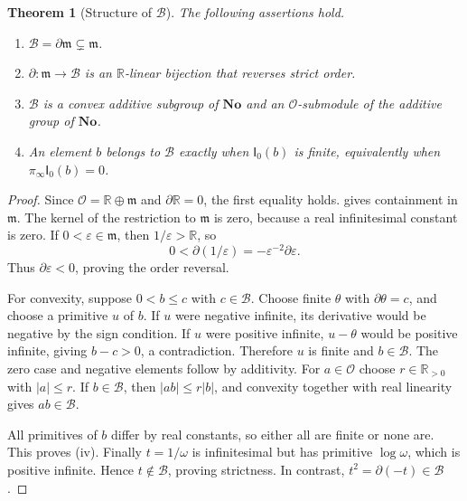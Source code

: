\documentclass[11pt,a4paper]{article}
\newtheorem{theorem}{Theorem}[section]
\theoremstyle{definition}
\newcommand{\No}{\mathbf{No}}
\newcommand{\R}{\mathbb R}
\newcommand{\D}{\partial}
\newcommand{\OO}{\mathcal O}
\newcommand{\mm}{\mathfrak m}
\newcommand{\BB}{\mathcal B}
\newcommand{\Ip}{\mathsf I_0}
\newcommand{\pinf}{\pi_{\infty}}
\numberwithin{equation}{section}
\begin{document}
\begin{theorem}[Structure of $\BB$]\label{thm:Bstructure}
The following assertions hold.
\begin{enumerate}[label=\textup{(\roman*)}]
\item $\BB=\D\mm\subsetneq\mm$.
\item $\D:\mm\to\BB$ is an $\R$-linear bijection that reverses strict
order.
\item $\BB$ is a convex additive subgroup of $\No$ and an $\OO$-submodule
of the additive group of $\No$.
\item An element $b$ belongs to $\BB$ exactly when $\Ip(b)$ is finite,
equivalently when $\pinf\Ip(b)=0$.
\end{enumerate}
\end{theorem}
\begin{proof}
Since $\OO=\R\oplus\mm$ and $\D\R=0$, the first equality holds.
 gives containment in $\mm$. The kernel of the
restriction to $\mm$ is zero, because a real infinitesimal constant is
zero. If $0<\varepsilon\in\mm$, then $1/\varepsilon>\R$, so
\[
 0<\D(1/\varepsilon)=-\varepsilon^{-2}\D\varepsilon.
\]
Thus $\D\varepsilon<0$, proving the order reversal.

For convexity, suppose $0<b\le c$ with $c\in\BB$. Choose finite
$\theta$ with $\D\theta=c$, and choose a primitive $u$ of $b$. If $u$
were negative infinite, its derivative would be negative by the sign
condition. If $u$ were positive infinite, $u-\theta$ would be positive
infinite, giving $b-c>0$, a contradiction. Therefore $u$ is finite and
$b\in\BB$. The zero case and negative elements follow by additivity.
For $a\in\OO$ choose $r\in\R_{>0}$ with $|a|\le r$. If $b\in\BB$,
then $|ab|\le r|b|$, and convexity together with real linearity gives
$ab\in\BB$.

All primitives of $b$ differ by real constants, so either all are finite
or none are. This proves (iv). Finally $t=1/\omega$ is infinitesimal but
has primitive $\log\omega$, which is positive infinite. Hence
$t\notin\BB$, proving strictness. In contrast,
$t^2=\D(-t)\in\BB$.
\end{proof}
\end{document}
